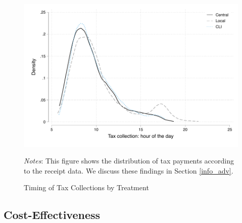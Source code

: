 \documentclass[12pt,english]{article}
\renewcommand{\footnotesize}{\fontsize{9pt}{11pt}\selectfont}\usepackage[unicode=true,
\begin{document}

\begin{figure}[H]
\centering{}\caption{Timing of Tax Collections by Treatment \label{time_collection_CvLvCLI.pdf}}
\includegraphics[scale=0.9]{Output/time_collection_CvLvCLI.pdf}
\usebox{\tablebox}\\[1ex]
\parbox{6in}{\footnotesize \textit{Notes}: This figure shows the distribution of tax payments according to the receipt data. We discuss these findings in Section \ref{info_adv}.}
\end{figure}


\subsection{Cost-Effectiveness}
\label{cost_effectiveness}

\end{document}
